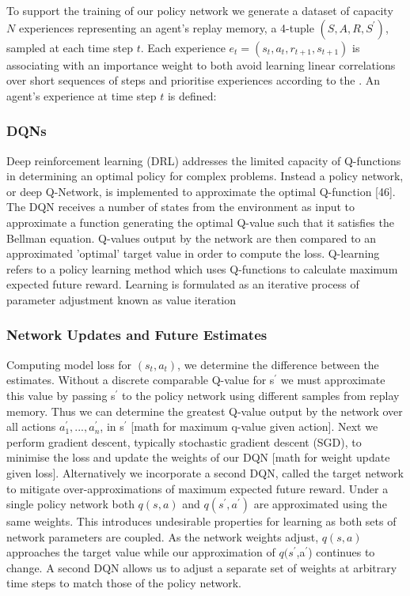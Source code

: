 \documentclass[runningheads]{llncs}
\begin{document}
To support the training of our policy network we generate a dataset of capacity $N$ experiences representing an agent's replay memory, a 4-tuple $(S,A,R,S^{\prime})$, sampled at each time step $t$. Each experience 
\begin{math}
	e_{t} = (s_t,a_t,r_{t+1},s_{t+1})
\end{math} is associating with an importance weight to both avoid learning linear correlations over short sequences of steps and prioritise experiences according to the . An agent's experience at time step $t$ is defined:


\subsubsection{DQNs}
Deep reinforcement learning (DRL) addresses the limited capacity of Q-functions in determining an optimal policy for complex problems. Instead a policy network, or deep Q-Network, is implemented to approximate the optimal Q-function [46]. The DQN receives a number of states from the environment as input to approximate a function generating the optimal Q-value such that it satisfies the Bellman equation. Q-values output by the network are then compared to an approximated 'optimal' target value in order to compute the loss. Q-learning refers to a policy learning method which uses Q-functions to calculate maximum expected future reward. Learning is formulated as an iterative process of parameter adjustment known as value iteration

\subsubsection{Network Updates and Future Estimates}
Computing model loss for $(s_t,a_t)$, we determine the difference between the estimates. Without a discrete comparable Q-value for s$^{\prime}$ we must approximate this value by passing s$^{\prime}$ to the policy network using different samples from replay memory. Thus we can determine the greatest Q-value output by the network over all actions $a^{\prime}_{1},...,a^{\prime}_n$, in s$^{\prime}$ [math for maximum q-value given action].  Next we perform gradient descent, typically stochastic gradient descent (SGD), to minimise the loss and update the weights of our DQN [math for weight update given loss]. Alternatively we incorporate a second DQN, called the target network to mitigate over-approximations of maximum expected future reward. Under a single policy network both $q(s,a)$ and $q(s^{\prime},a^{\prime})$ are approximated using the same weights. This introduces undesirable properties for learning as both sets of network parameters are coupled. As the network weights adjust, $q(s,a)$ approaches the target value while our approximation of $q(s^{\prime}$,a$^{\prime}$) continues to change. A second DQN allows us to adjust a separate set of weights at arbitrary time steps to match those of the policy network.
\end{document}
